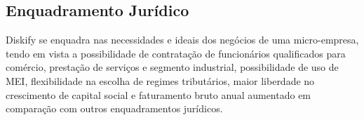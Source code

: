\documentclass[onecolumn,12pt]{asme2ej}
\begin{document}
\subsection{Enquadramento Jurídico}

Diskify se enquadra nas necessidades e ideais dos negócios de uma micro-empresa, tendo em vista a possibilidade de contratação de funcionários qualificados para comércio, prestação de serviços e segmento industrial, possibilidade de uso de MEI, flexibilidade na escolha de regimes tributários, maior liberdade no crescimento de capital social e faturamento bruto anual aumentado em comparação com outros enquadramentos jurídicos.


\printbibliography  
\end{document}
